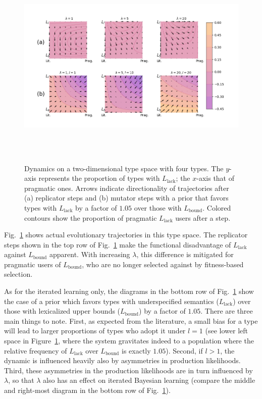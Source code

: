 \documentclass[a4paper, 11pt]{article}
\theoremstyle{Satz}
\newcommand{\mylang}[1]{\ensuremath{L_{\text{#1}}}\xspace} %
\newcommand{\Lbound}{\mylang{bound}}
\newcommand{\Llack}{\mylang{lack}}
\begin{document}
\begin{figure}[t]
\centering
\includegraphics[width=1.08\textwidth,height=10cm, keepaspectratio]{./plots/fig-contourb105k5.png}
\caption{Dynamics on a two-dimensional type space with four types. The $y$-axis represents the
  proportion of types with $\Llack$; the $x$-axis that of pragmatic ones. Arrows indicate
  directionality of trajectories after (a) replicator steps and (b) mutator steps with a prior
  that favors types with $\Llack$ by a factor of $1.05$ over those with $\Lbound$. Colored
  contours show the proportion of pragmatic $\Llack$ users after a step.}

\label{fig:quiver}
\end{figure}

Fig.~\ref{fig:quiver} shows actual evolutionary trajectories in this type space. The replicator
steps shown in the top row of Fig.~\ref{fig:quiver} make the functional disadvantage of
$\Llack$ against $\Lbound$ apparent. With increasing $\lambda$, this difference is mitigated for pragmatic users of $\Lbound$, who are no longer selected against by fitness-based selection. 

As for the iterated learning only, the diagrams in the bottom row of Fig.~\ref{fig:quiver} show
the case of a prior which favors types with underspecified semantics ($\Llack$) over those with
lexicalized upper bounds ($\Lbound$) by a factor of $1.05$. There are three main things to
note. First, as expected from the literature, a small bias for a type will lead to larger
proportions of types who adopt it under $l=1$ (see lower left space in Figure~\ref{fig:quiver},
where the system gravitates indeed to a population where the relative frequency of $\Llack$
over $\Lbound$ is exactly $1.05$). Second, if $l>1$, the dynamic is influenced heavily also by
asymmetries in production likelihoods. Third, these asymmetries in the production likelihoods
are in turn influenced by $\lambda$, so that $\lambda$ also has an effect on iterated Bayesian
learning (compare the middle and right-most diagram in the bottom row of
Fig.~\ref{fig:quiver}).
\end{document}
